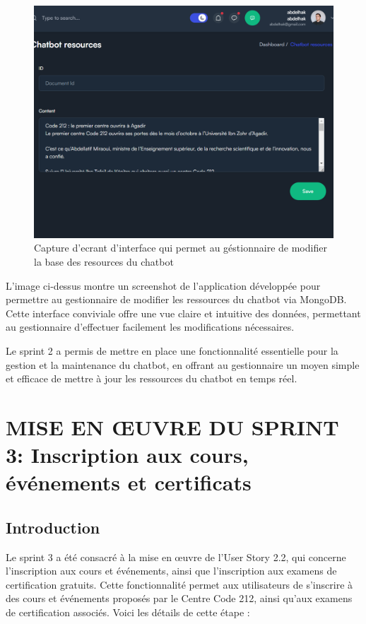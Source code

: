 \documentclass[a4paper, 11pt, openany]{report}
\begin{document}
\begin{figure}[H]
\centering
\includegraphics[width=\textwidth]{admin-doc.png} 
\caption{Capture d'ecrant d'interface qui permet au géstionnaire de modifier la base des resources du chatbot}
\label{fig:screen_chat_res}
\end{figure}

L'image ci-dessus montre un screenshot de l'application développée pour permettre au gestionnaire de modifier les ressources du chatbot via MongoDB. Cette interface conviviale offre une vue claire et intuitive des données, permettant au gestionnaire d'effectuer facilement les modifications nécessaires.

Le sprint 2 a permis de mettre en place une fonctionnalité essentielle pour la gestion et la maintenance du chatbot, en offrant au gestionnaire un moyen simple et efficace de mettre à jour les ressources du chatbot en temps réel.

\newpage


\chapter{MISE EN ŒUVRE DU SPRINT 3: Inscription aux cours, événements et certificats}
\section{Introduction}

Le sprint 3 a été consacré à la mise en œuvre de l'User Story 2.2, qui concerne l'inscription aux cours et événements, ainsi que l'inscription aux examens de certification gratuits. Cette fonctionnalité permet aux utilisateurs de s'inscrire à des cours et événements proposés par le Centre Code 212, ainsi qu'aux examens de certification associés. Voici les détails de cette étape :
\end{document}
